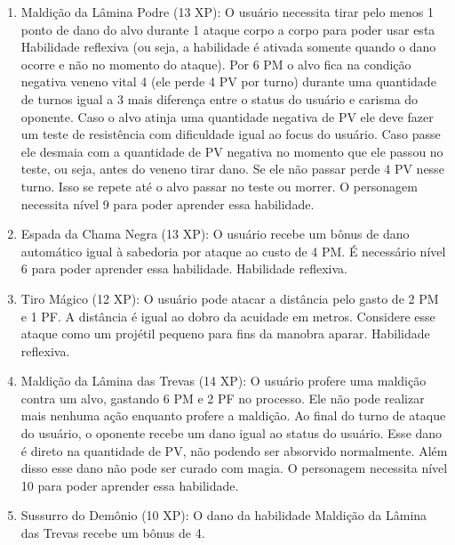 \begin{enumerate}
  	\item Maldição da Lâmina Podre (13 XP): O usuário necessita tirar pelo menos 1 ponto de dano do alvo durante 1 ataque corpo a corpo para poder usar esta Habilidade reflexiva (ou seja, a habilidade é ativada somente quando o dano ocorre e não no momento do ataque). Por 6 PM o alvo fica na condição negativa veneno vital 4 (ele perde 4 PV por turno) durante uma quantidade de turnos igual a 3 mais diferença entre o status do usuário e carisma do oponente. Caso o alvo atinja uma quantidade negativa de PV ele deve fazer um teste de resistência com dificuldade igual ao focus do usuário. Caso passe ele desmaia com a quantidade de PV negativa no momento que ele passou no teste, ou seja, antes do veneno tirar dano. Se ele não passar perde 4 PV nesse turno. Isso se repete até o alvo passar no teste ou morrer. O personagem necessita nível 9 para poder aprender essa habilidade.
    
  	\item Espada da Chama Negra (13 XP): O usuário recebe um bônus de dano automático igual à sabedoria por ataque ao custo de 4 PM. É necessário nível 6 para poder aprender essa habilidade. Habilidade reflexiva.

  	\item Tiro Mágico (12 XP): O usuário pode atacar a distância pelo gasto de 2 PM e 1 PF. A distância é igual ao dobro da acuidade em metros. Considere esse ataque como um projétil pequeno para fins da manobra aparar. Habilidade reflexiva.
    
  	\item Maldição da Lâmina das Trevas (14 XP): O usuário profere uma maldição contra um alvo, gastando 6 PM e 2 PF no processo. Ele não pode realizar mais nenhuma ação enquanto profere a maldição. Ao final do turno de ataque do usuário, o oponente recebe um dano igual ao status do usuário. Esse dano é direto na quantidade de PV, não podendo ser absorvido normalmente. Além disso esse dano não pode ser curado com magia. O personagem necessita nível 10 para poder aprender essa habilidade.

  \item Sussurro do Demônio (10 XP): O dano da habilidade Maldição da Lâmina das Trevas recebe um bônus de 4.


\end{enumerate}
